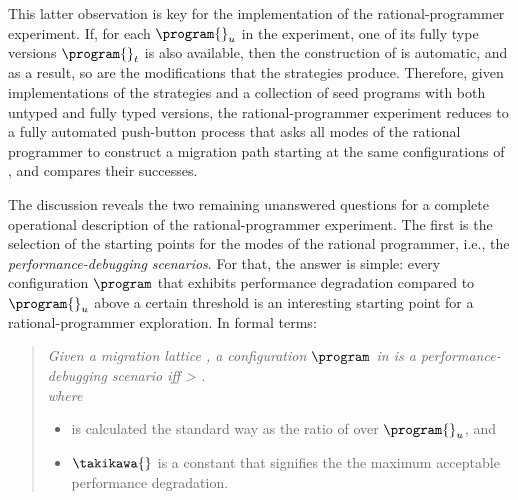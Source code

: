 This latter observation is key for the implementation of the
rational-programmer experiment. If, for each  $\program{}_u$ in the
experiment, one of its fully type versions $\program{}_t$ is also
available, then the construction of  is
automatic, and as a result, so are the modifications that the strategies 
produce. Therefore, given implementations of the strategies and a
collection of seed programs with both untyped and fully typed versions,
the rational-programmer experiment reduces to a fully automated push-button 
process that asks all modes of the rational programmer to
construct a migration path starting at the same configurations of   
, and compares their successes. 

The discussion reveals the two remaining unanswered questions for a complete
operational description of the rational-programmer experiment. The first
 is the selection of the starting points for the modes of the rational
programmer, i.e., the \emph{performance-debugging scenarios}. 
For that, the answer is simple: 
every configuration $\program$ that exhibits performance degradation compared to 
$\program{}_u$ above a certain threshold is an interesting starting point
for a rational-programmer exploration. In formal terms: 

\begin{quote}
\it Given a migration lattice , a configuration $\program$
  in  is a \emph{performance-debugging scenario}
  iff  > \takikawa{}.\\
  where 
\begin{itemize}
\item  \slowdownkw{} is
  calculated the standard way as the ratio of \program{} over
  $\program{}_u$, and
\item $\takikawa{}$ is a constant that signifies the
  the maximum acceptable performance degradation.
\end{itemize}
\end{quote}

